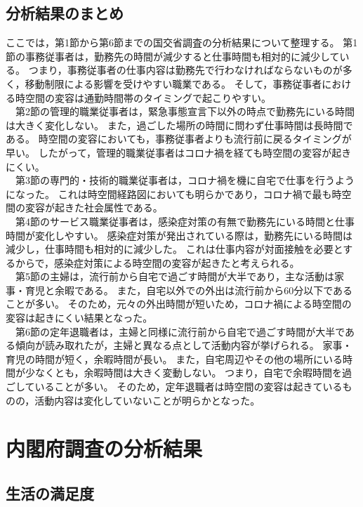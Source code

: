 \documentclass[paper={210mm,297mm},line_length=35zw,number_of_lines=31,head_space=30mm,gutter=40mm,baselineskip=2.0zw,headfoot_verticalposition=1.5zw]{jlreq}
\begin{document}
\subsection{分析結果のまとめ}

ここでは，第1節から第6節までの国交省調査の分析結果について整理する。
第1節の事務従事者は，勤務先の時間が減少すると仕事時間も相対的に減少している。
つまり，事務従事者の仕事内容は勤務先で行わなければならないものが多く，移動制限による影響を受けやすい職業である。
そして，事務従事者における時空間の変容は通勤時間帯のタイミングで起こりやすい。\\
　第2節の管理的職業従事者は，緊急事態宣言下以外の時点で勤務先にいる時間は大きく変化しない。
また，過ごした場所の時間に問わず仕事時間は長時間である。
時空間の変容においても，事務従事者よりも流行前に戻るタイミングが早い。
したがって，管理的職業従事者はコロナ禍を経ても時空間の変容が起きにくい。\\
　第3節の専門的・技術的職業従事者は，コロナ禍を機に自宅で仕事を行うようになった。
これは時空間経路図においても明らかであり，コロナ禍で最も時空間の変容が起きた社会属性である。\\
　第4節のサービス職業従事者は，感染症対策の有無で勤務先にいる時間と仕事時間が変化しやすい。
感染症対策が発出されている際は，勤務先にいる時間は減少し，仕事時間も相対的に減少した。
これは仕事内容が対面接触を必要とするからで，感染症対策による時空間の変容が起きたと考えられる。\\
　第5節の主婦は，流行前から自宅で過ごす時間が大半であり，主な活動は家事・育児と余暇である。
また，自宅以外での外出は流行前から60分以下であることが多い。
そのため，元々の外出時間が短いため，コロナ禍による時空間の変容は起きにくい結果となった。\\
　第6節の定年退職者は，主婦と同様に流行前から自宅で過ごす時間が大半である傾向が読み取れたが，主婦と異なる点として活動内容が挙げられる。
家事・育児の時間が短く，余暇時間が長い。
また，自宅周辺やその他の場所にいる時間が少なくとも，余暇時間は大きく変動しない。
つまり，自宅で余暇時間を過ごしていることが多い。
そのため，定年退職者は時空間の変容は起きているものの，活動内容は変化していないことが明らかとなった。\\

\section{内閣府調査の分析結果}

\subsection{生活の満足度}
\end{document}
